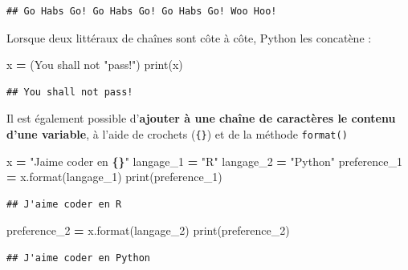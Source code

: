 \documentclass[
  12pt,
]{book}
\newenvironment{Shaded}{\begin{snugshade}}{\end{snugshade}}
\newcommand{\BuiltInTok}[1]{#1}
\newcommand{\NormalTok}[1]{#1}
\newcommand{\OperatorTok}[1]{\textcolor[rgb]{0.81,0.36,0.00}{\textbf{#1}}}
\newcommand{\SpecialCharTok}[1]{\textcolor[rgb]{0.81,0.36,0.00}{\textbf{#1}}}
\newcommand{\StringTok}[1]{\textcolor[rgb]{0.31,0.60,0.02}{#1}}
\numberwithin{equation}{section}
\numberwithin{countremarque}{section}
\begin{document}
\begin{lstlisting}
## Go Habs Go! Go Habs Go! Go Habs Go! Woo Hoo!
\end{lstlisting}

Lorsque deux littéraux de chaînes sont côte à côte, Python les concatène :

\begin{Shaded}
\begin{Highlighting}[]
\NormalTok{x }\OperatorTok{=}\NormalTok{ (}\StringTok{\textquotesingle{}You shall \textquotesingle{}} \StringTok{\textquotesingle{}not \textquotesingle{}} \StringTok{"pass!"}\NormalTok{)}
\BuiltInTok{print}\NormalTok{(x)}
\end{Highlighting}
\end{Shaded}

\begin{lstlisting}
## You shall not pass!
\end{lstlisting}

Il est également possible d'\textbf{ajouter à une chaîne de caractères le contenu d'une variable}, à l'aide de crochets (\texttt{\{\}}) et de la méthode \texttt{format()}

\begin{Shaded}
\begin{Highlighting}[]
\NormalTok{x }\OperatorTok{=} \StringTok{"J\textquotesingle{}aime coder en }\SpecialCharTok{\{\}}\StringTok{"}
\NormalTok{langage\_1 }\OperatorTok{=} \StringTok{"R"}
\NormalTok{langage\_2 }\OperatorTok{=} \StringTok{"Python"}
\NormalTok{preference\_1 }\OperatorTok{=}\NormalTok{ x.}\BuiltInTok{format}\NormalTok{(langage\_1)}
\BuiltInTok{print}\NormalTok{(preference\_1)}
\end{Highlighting}
\end{Shaded}

\begin{lstlisting}
## J'aime coder en R
\end{lstlisting}

\begin{Shaded}
\begin{Highlighting}[]
\NormalTok{preference\_2 }\OperatorTok{=}\NormalTok{ x.}\BuiltInTok{format}\NormalTok{(langage\_2)}
\BuiltInTok{print}\NormalTok{(preference\_2)}
\end{Highlighting}
\end{Shaded}

\begin{lstlisting}
## J'aime coder en Python
\end{lstlisting}
\end{document}
